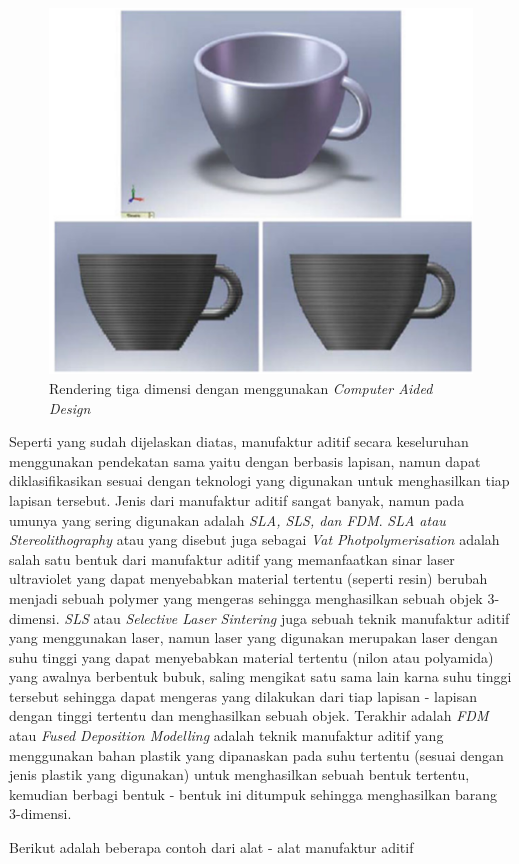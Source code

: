 \begin{figure}[H]
    \centering
    \includegraphics[width=0.6\linewidth]{gambar/cad-image.png}
    \caption{Rendering tiga dimensi dengan menggunakan \textit{Computer Aided Design}}
    \label{fig:cad}
\end{figure}

Seperti yang sudah dijelaskan diatas, manufaktur aditif secara keseluruhan menggunakan pendekatan sama yaitu dengan berbasis lapisan, namun dapat diklasifikasikan sesuai dengan teknologi yang digunakan untuk menghasilkan tiap lapisan tersebut. Jenis dari manufaktur aditif sangat banyak, namun pada umunya yang sering digunakan adalah \textit{SLA, SLS, dan FDM}. \textit{SLA atau Stereolithography} atau yang disebut juga sebagai \textit{Vat Photpolymerisation} adalah salah satu bentuk dari manufaktur aditif yang memanfaatkan sinar laser ultraviolet yang dapat menyebabkan material tertentu (seperti resin) berubah menjadi sebuah polymer yang mengeras sehingga menghasilkan sebuah objek 3-dimensi. \textit{SLS} atau \textit{Selective Laser Sintering} juga sebuah teknik manufaktur aditif yang menggunakan laser, namun laser yang digunakan merupakan laser dengan suhu tinggi yang dapat menyebabkan material tertentu (nilon atau polyamida) yang awalnya berbentuk bubuk, saling mengikat satu sama lain karna suhu tinggi tersebut sehingga dapat mengeras yang dilakukan dari tiap lapisan - lapisan dengan tinggi tertentu dan menghasilkan sebuah objek. Terakhir adalah \textit{FDM} atau \textit{Fused Deposition Modelling} adalah teknik manufaktur aditif yang menggunakan bahan plastik yang dipanaskan pada suhu tertentu (sesuai dengan jenis plastik yang digunakan) untuk menghasilkan sebuah bentuk tertentu, kemudian berbagi bentuk - bentuk ini ditumpuk sehingga menghasilkan barang 3-dimensi.

Berikut adalah beberapa contoh dari alat - alat manufaktur aditif

